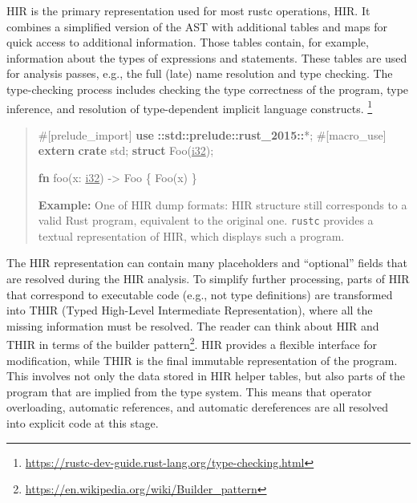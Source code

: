 \documentclass[
  11pt,
  twoside,symmetric]{report}
\newenvironment{Shaded}{}{}
\newcommand{\AttributeTok}[1]{#1}
\newcommand{\DataTypeTok}[1]{\underline{#1}}
\newcommand{\KeywordTok}[1]{\textbf{#1}}
\newcommand{\NormalTok}[1]{#1}
\newcommand{\OperatorTok}[1]{#1}
\newcommand{\PreprocessorTok}[1]{\textbf{#1}}
\DeclareRobustCommand{\href}[2]{#2\footnote{\url{#1}}}
\begin{document}
HIR is the primary representation used for most rustc
operations, HIR. It combines a
simplified version of the AST with additional tables and maps for quick
access to additional information. Those tables contain, for example,
information about the types of expressions and statements. These tables
are used for analysis passes, e.g., the full (late) name resolution and
type checking. The type-checking process includes checking the type
correctness of the program, type inference, and resolution of
type-dependent implicit language
constructs. \footnote{\url{https://rustc-dev-guide.rust-lang.org/type-checking.html}}

\begin{quote}
\begin{Shaded}
\begin{Highlighting}[]
 \AttributeTok{\#[}\NormalTok{prelude\_import}\AttributeTok{]}
 \KeywordTok{use} \PreprocessorTok{::std::prelude::rust\_2015::}\OperatorTok{*;}
 \AttributeTok{\#[}\NormalTok{macro\_use}\AttributeTok{]}
 \KeywordTok{extern} \KeywordTok{crate}\NormalTok{ std}\OperatorTok{;}
 \KeywordTok{struct}\NormalTok{ Foo(}\DataTypeTok{i32}\NormalTok{)}\OperatorTok{;}

 \KeywordTok{fn}\NormalTok{ foo(x}\OperatorTok{:} \DataTypeTok{i32}\NormalTok{) }\OperatorTok{{-}\textgreater{}}\NormalTok{ Foo }\OperatorTok{\{}\NormalTok{ Foo(x) }\OperatorTok{\}}
\end{Highlighting}
\end{Shaded}

\textbf{Example:} One of HIR dump formats: HIR structure still
corresponds to a valid Rust program, equivalent to the original one.
\texttt{rustc} provides a textual representation of HIR, which displays
such a program.
\end{quote}

The HIR representation can contain many placeholders and ``optional''
fields that are resolved during the HIR analysis. To simplify further
processing, parts of HIR that correspond to executable code (e.g., not
type definitions) are transformed into THIR (Typed High-Level
Intermediate Representation), where all the missing information must be
resolved. The reader can think about HIR and THIR in terms of the
\href{https://en.wikipedia.org/wiki/Builder_pattern}{builder pattern}.
HIR provides a flexible interface for modification, while THIR is the
final immutable representation of the program. This involves not only
the data stored in HIR helper tables, but also parts of the program that
are implied from the type system. This means that operator overloading,
automatic references, and automatic dereferences are all resolved into
explicit code at this stage.
\end{document}
